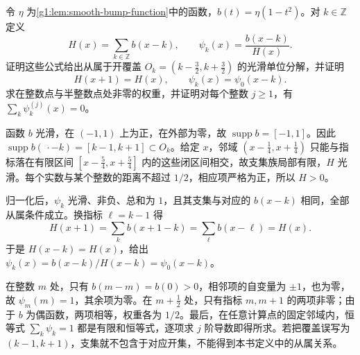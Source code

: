 \begin{exercise}\label{g1:ex:smooth-partition-on-line}
	令 \(\eta\) 为\cref{g1:lem:smooth-bump-function}中的函数，\(b(t)=\eta(1-t^2)\)。对 \(k\in\mathbb Z\) 定义
	\[
		H(x)=\sum_{k\in\mathbb Z}b(x-k),\qquad
		\psi_k(x)=\frac{b(x-k)}{H(x)}.
	\]
	证明这些公式给出从属于开覆盖 \(O_k=(k-\tfrac32,k+\tfrac32)\) 的光滑单位分解，并证明
	\[
		H(x+1)=H(x),\qquad
		\psi_k(x)=\psi_0(x-k).
	\]
	求在整数点与半整数点处非零的权重，并证明对每个整数 \(j\ge1\)，有 \(\sum_k\psi_k^{(j)}(x)=0\)。
\end{exercise}
\begin{solution}
	函数 \(b\) 光滑，在 \((-1,1)\) 上为正，在外部为零，故 \(\operatorname{supp}b=[-1,1]\)。因此 \(\operatorname{supp}b(\,\cdot-k)=[k-1,k+1]\subset O_k\)。给定 \(x\)，邻域 \((x-\tfrac14,x+\tfrac14)\) 只能与指标落在有限区间 \([x-\tfrac54,x+\tfrac54]\) 内的这些闭区间相交，故支集族局部有限，\(H\) 光滑。每个实数与某个整数的距离不超过 \(1/2\)，相应项严格为正，所以 \(H>0\)。

	归一化后，\(\psi_k\) 光滑、非负、总和为 \(1\)，且其支集与对应的 \(b(x-k)\) 相同，全部从属条件成立。换指标 \(\ell=k-1\) 得
	\[
		H(x+1)=\sum_k b(x+1-k)=\sum_\ell b(x-\ell)=H(x).
	\]
	于是 \(H(x-k)=H(x)\)，给出 \(\psi_k(x)=b(x-k)/H(x-k)=\psi_0(x-k)\)。

	在整数 \(m\) 处，只有 \(b(m-m)=b(0)>0\)，相邻项的自变量为 \(\pm1\)，也为零，故 \(\psi_m(m)=1\)，其余项为零。在 \(m+\tfrac12\) 处，只有指标 \(m,m+1\) 的两项非零；由于 \(b\) 为偶函数，两项相等，权重各为 \(1/2\)。最后，在任意计算点的固定邻域内，恒等式 \(\sum_k\psi_k=1\) 都是有限和恒等式，逐项求 \(j\) 阶导数即得所求。若把覆盖误写为 \((k-1,k+1)\)，支集就不包含于对应开集，不能得到本书定义中的从属关系。
\end{solution}

